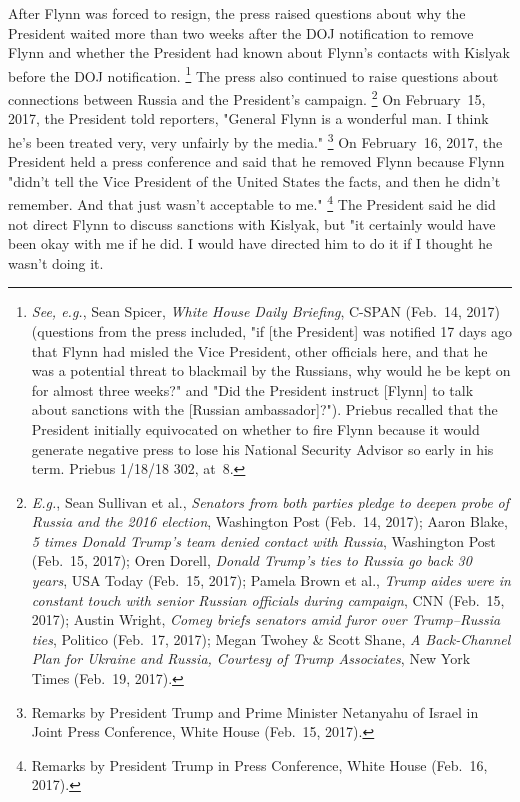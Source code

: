 After Flynn was forced to resign, the press raised questions about why the President waited more than two weeks after the DOJ notification to remove Flynn and whether the President had known about Flynn's contacts with Kislyak before the DOJ notification.%
\footnote{\textit{See, e.g.}, Sean Spicer, \textit{White House Daily Briefing}, C-SPAN (Feb.~14, 2017) (questions from the press included, "if [the President] was notified 17 days ago that Flynn had misled the Vice President, other officials here, and that he was a potential threat to blackmail by the Russians, why would he be kept on for almost three weeks?" and "Did the President instruct [Flynn] to talk about sanctions with the [Russian ambassador]?").
Priebus recalled that the President initially equivocated on whether to fire Flynn because it would generate negative press to lose his National Security Advisor so early in his term.
Priebus 1/18/18 302, at~8.}
The press also continued to raise questions about connections between Russia and the President's campaign.%
\footnote{\textit{E.g.}, Sean Sullivan et al., \textit{Senators from both parties pledge to deepen probe of Russia and the 2016 election}, Washington Post (Feb.~14, 2017);
Aaron Blake, \textit{5 times Donald Trump's team denied contact with Russia}, Washington Post (Feb.~15, 2017);
Oren Dorell, \textit{Donald Trump's ties to Russia go back 30 years}, USA Today (Feb.~15, 2017);
Pamela Brown et al., \textit{Trump aides were in constant touch with senior Russian officials during campaign}, CNN (Feb.~15, 2017);
Austin Wright, \textit{Comey briefs senators amid furor over Trump--Russia ties}, Politico (Feb.~17, 2017);
Megan Twohey \& Scott Shane, \textit{A Back-Channel Plan for Ukraine and Russia, Courtesy of Trump Associates}, New York Times (Feb.~19, 2017).}
On February~15, 2017, the President told reporters, "General Flynn is a wonderful man.
I think he's been treated very, very unfairly by the media."%
\footnote{Remarks by President Trump and Prime Minister Netanyahu of Israel in Joint Press Conference, White House (Feb.~15, 2017).}
On February~16, 2017, the President held a press conference and said that he removed Flynn because Flynn "didn't tell the Vice President of the United States the facts, and then he didn't remember.
And that just wasn't acceptable to me."%
\footnote{Remarks by President Trump in Press Conference, White House (Feb.~16, 2017).}
The President said he did not direct Flynn to discuss sanctions with Kislyak, but "it certainly would have been okay with me if he did.
I would have directed him to do it if I thought he wasn't doing it.
